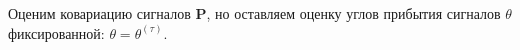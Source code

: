 \documentclass[11pt]{article}
\begin{document}
\begin{center}
\fontsize{14}{18}\selectfont {}
\end{center}
Оценим ковариацию сигналов $\mathbf{P}$, но оставляем оценку углов прибытия сигналов $\theta$ фиксированной: $\theta = \theta^{(\tau)}$.
\begin{center}
\fontsize{16}{20}\selectfont {}
\end{center}
\begin{center}
\fontsize{14}{18}\selectfont {}
\end{center}
\begin{center}
\fontsize{14}{18}\selectfont {}
\end{center}
\begin{center}
\fontsize{14}{18}\selectfont {}
\end{center}
\begin{center}
\fontsize{14}{18}\selectfont {}
\end{center}
\begin{center}
\fontsize{16}{20}\selectfont {}
\end{center}
\end{document}
